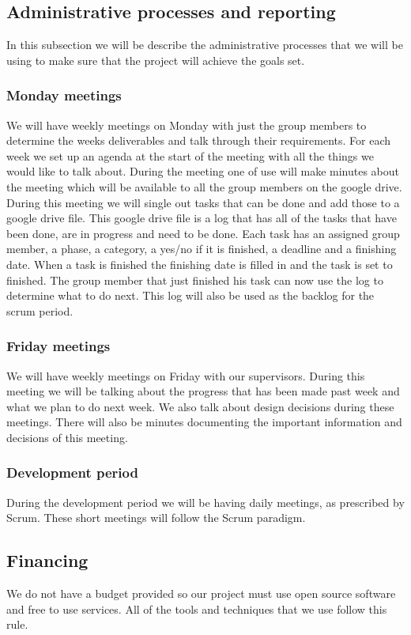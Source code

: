 \documentclass[]{article}
\begin{document}
\subsection{Administrative processes and reporting}
In this subsection we will be describe the administrative processes that we will be using to make sure that the project will achieve the goals set.
\subsubsection{Monday meetings}
We will have weekly meetings on Monday with just the group members to determine the weeks deliverables and talk through their requirements.
For each week we set up an agenda at the start of the meeting with all the things we would like to talk about.
During the meeting one of use will make minutes about the meeting which will be available to all the group members on the google drive.
During this meeting we will single out tasks that can be done and add those to a google drive file.
This google drive file is a log that has all of the tasks that have been done, are in progress and need to be done.
Each task has an assigned group member, a phase, a category, a yes/no if it is finished, a deadline and a finishing date.
When a task is finished the finishing date is filled in and the task is set to finished. The group member that just finished his task can now use the log to determine what to do next.
This log will also be used as the backlog for the scrum period.
\subsubsection{Friday meetings}
We will have weekly meetings on Friday with our supervisors.
During this meeting we will be talking about the progress that has been made past week and what we plan to do next week.
We also talk about design decisions during these meetings.
There will also be minutes documenting the important information and decisions of this meeting.
\subsubsection{Development period}
During the development period we will be having daily meetings, as prescribed by Scrum.
These short meetings will follow the Scrum paradigm.

\subsection{Financing}
We do not have a budget provided so our project must use open source software and free to use services.
All of the tools and techniques that we use follow this rule.
\end{document}
